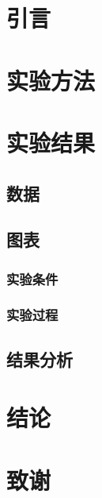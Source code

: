 ﻿\documentclass{ctexart}%
\begin{document}
    \tableofcontents

    \section{引言}
    \section{实验方法}
    \section{实验结果}
    \subsection{数据}
    \subsection{图表}
    \subsubsection{实验条件}%
    \subsubsection{实验过程}
    \subsection{结果分析}
    \section{结论}
    \section{致谢}
\end{document}

